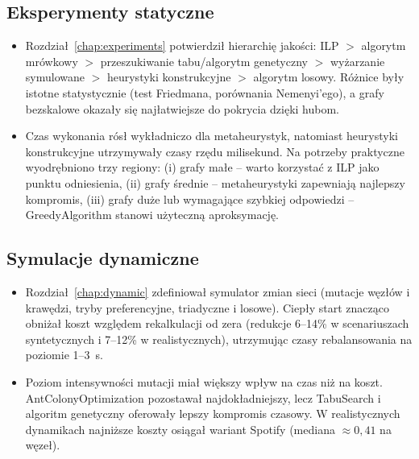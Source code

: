 {\subsection*{Eksperymenty statyczne}
\begin{itemize}
  \item Rozdział~\ref{chap:experiments} potwierdził hierarchię jakości: ILP $>$ algorytm mrówkowy $>$ przeszukiwanie tabu/algorytm genetyczny $>$ wyżarzanie symulowane $>$ heurystyki konstrukcyjne $>$ algorytm losowy. Różnice były istotne statystycznie (test Friedmana, porównania Nemenyi'ego), a grafy bezskalowe okazały się najłatwiejsze do pokrycia dzięki hubom.
  \item Czas wykonania rósł wykładniczo dla metaheurystyk, natomiast heurystyki konstrukcyjne utrzymywały czasy rzędu milisekund. Na potrzeby praktyczne wyodrębniono trzy regiony: (i) grafy małe -- warto korzystać z ILP jako punktu odniesienia, (ii) grafy średnie -- metaheurystyki zapewniają najlepszy kompromis, (iii) grafy duże lub wymagające szybkiej odpowiedzi -- GreedyAlgorithm stanowi użyteczną aproksymację.
\end{itemize}

\subsection*{Symulacje dynamiczne}
\begin{itemize}
  \item Rozdział~\ref{chap:dynamic} zdefiniował symulator zmian sieci (mutacje węzłów i krawędzi, tryby preferencyjne, triadyczne i losowe). Ciepły start znacząco obniżał koszt względem rekalkulacji od zera (redukcje 6--14\% w scenariuszach syntetycznych i 7--12\% w realistycznych), utrzymując czasy rebalansowania na poziomie 1--3~s.
  \item Poziom intensywności mutacji miał większy wpływ na czas niż na koszt. AntColonyOptimization pozostawał najdokładniejszy, lecz TabuSearch i algoritm genetyczny oferowały lepszy kompromis czasowy. W realistycznych dynamikach najniższe koszty osiągał wariant Spotify (mediana $\approx0{,}41$ na węzeł).
\end{itemize}

}
